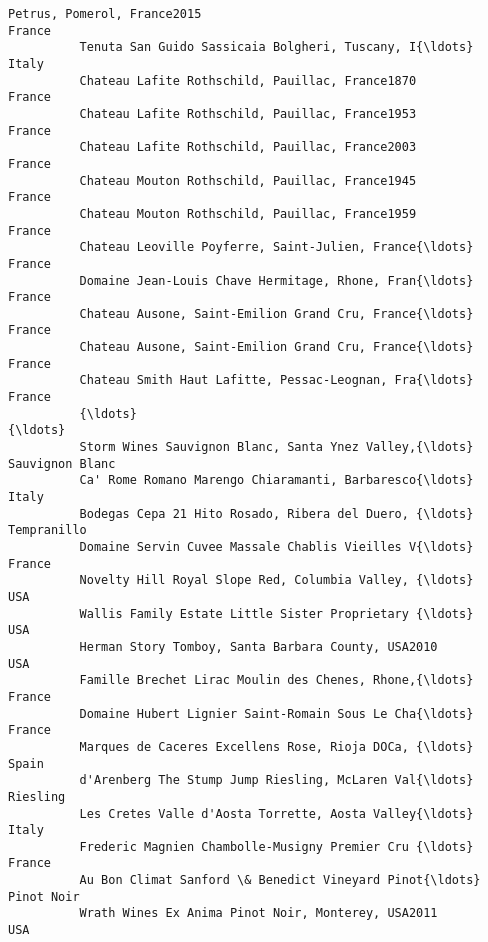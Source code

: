 \documentclass[11pt]{article}
\begin{document}
\begin{Verbatim}[commandchars=\\\{\}]
          Petrus, Pomerol, France2015                                           France   
          Tenuta San Guido Sassicaia Bolgheri, Tuscany, I{\ldots}                     Italy   
          Chateau Lafite Rothschild, Pauillac, France1870                       France   
          Chateau Lafite Rothschild, Pauillac, France1953                       France   
          Chateau Lafite Rothschild, Pauillac, France2003                       France   
          Chateau Mouton Rothschild, Pauillac, France1945                       France   
          Chateau Mouton Rothschild, Pauillac, France1959                       France   
          Chateau Leoville Poyferre, Saint-Julien, France{\ldots}                    France   
          Domaine Jean-Louis Chave Hermitage, Rhone, Fran{\ldots}                    France   
          Chateau Ausone, Saint-Emilion Grand Cru, France{\ldots}                    France   
          Chateau Ausone, Saint-Emilion Grand Cru, France{\ldots}                    France   
          Chateau Smith Haut Lafitte, Pessac-Leognan, Fra{\ldots}                    France   
          {\ldots}                                                                      {\ldots}   
          Storm Wines Sauvignon Blanc, Santa Ynez Valley,{\ldots}           Sauvignon Blanc   
          Ca' Rome Romano Marengo Chiaramanti, Barbaresco{\ldots}                     Italy   
          Bodegas Cepa 21 Hito Rosado, Ribera del Duero, {\ldots}               Tempranillo   
          Domaine Servin Cuvee Massale Chablis Vieilles V{\ldots}                    France   
          Novelty Hill Royal Slope Red, Columbia Valley, {\ldots}                       USA   
          Wallis Family Estate Little Sister Proprietary {\ldots}                       USA   
          Herman Story Tomboy, Santa Barbara County, USA2010                       USA   
          Famille Brechet Lirac Moulin des Chenes, Rhone,{\ldots}                    France   
          Domaine Hubert Lignier Saint-Romain Sous Le Cha{\ldots}                    France   
          Marques de Caceres Excellens Rose, Rioja DOCa, {\ldots}                     Spain   
          d'Arenberg The Stump Jump Riesling, McLaren Val{\ldots}                  Riesling   
          Les Cretes Valle d'Aosta Torrette, Aosta Valley{\ldots}                     Italy   
          Frederic Magnien Chambolle-Musigny Premier Cru {\ldots}                    France   
          Au Bon Climat Sanford \& Benedict Vineyard Pinot{\ldots}                Pinot Noir   
          Wrath Wines Ex Anima Pinot Noir, Monterey, USA2011                       USA   

\end{Verbatim}
\end{document}
